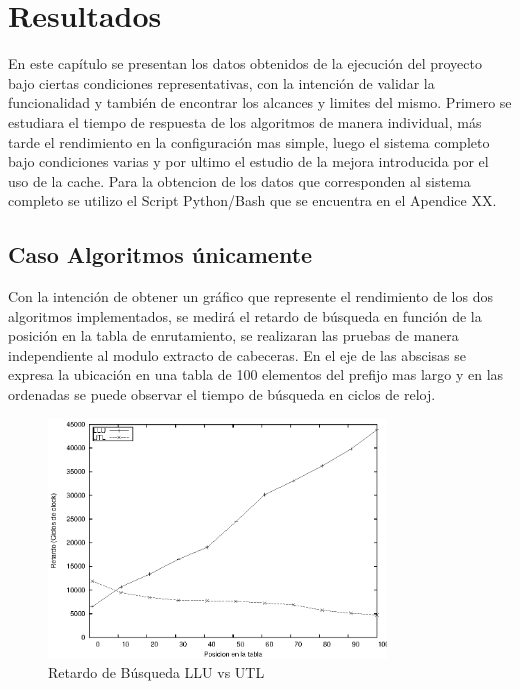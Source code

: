 \chapter{Resultados}

En este capítulo se presentan los datos obtenidos de la ejecución del proyecto bajo ciertas condiciones representativas, con la intención de validar la funcionalidad y también de encontrar los alcances y limites del mismo. Primero se estudiara el tiempo de respuesta de los algoritmos de manera individual, más tarde el rendimiento en la configuración mas simple, luego el sistema completo bajo condiciones varias y por ultimo el estudio de la mejora introducida por el uso de la cache. Para la obtencion de los datos que corresponden al sistema completo se utilizo el Script Python/Bash que se encuentra en el Apendice XX.


\section{Caso Algoritmos únicamente}

Con la intención de obtener un gráfico que represente el rendimiento de los dos algoritmos implementados, se medirá el retardo de búsqueda en función de la posición en la tabla de enrutamiento, se realizaran las pruebas de manera independiente al modulo extracto de cabeceras. En el eje de las abscisas se expresa la ubicación en una tabla de 100 elementos del prefijo mas largo y en las ordenadas se puede observar el tiempo de búsqueda en ciclos de reloj.

\begin{figure}[h]
  \centering
	\includegraphics[width=0.8\textwidth]{5-resultados/graf/llu-utlsof.eps}
  \caption{Retardo de Búsqueda LLU vs UTL}
  \label{fig}
\end{figure}

